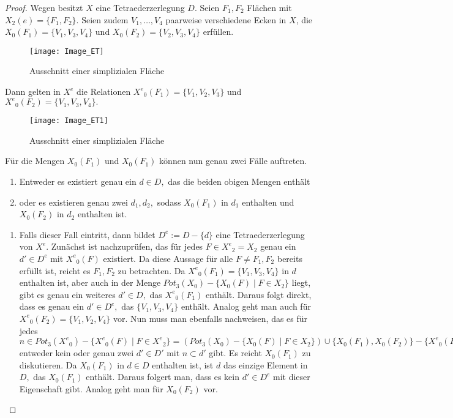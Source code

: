 \documentclass[12pt,titlepage,twoside,cleardoublepage]{article}
\theoremstyle{nummermitklammern}
\numberwithin{equation}{section}
\begin{document}
 \begin{proof}
 Wegen  besitzt $X$ eine Tetraederzerlegung $D.$ Seien $F_1,F_2$ Flächen mit $X_2(e)=\{F_1,F_2\}.$ Seien zudem $V_1,\ldots,V_4$ paarweise verschiedene Ecken in $X$, die $X_0(F_1)=\{V_1,V_3,V_4\}$ und $X_0(F_2)=\{V_2,V_3,V_4\}$ erfüllen.
 \begin{figure}[H]
\begin{center}
\texttt{[image: Image\_ET]}
\end{center}
\caption{Ausschnitt einer simplizialen Fläche}
\end{figure}
 
 Dann gelten in $X^e$ die Relationen ${X^e}_0(F_1)=\{V_1,V_2,V_3\}$ und ${X^e}_0(F_2)=\{V_1,V_3,V_4\}.$
 \begin{figure}[H]
\begin{center}
\texttt{[image: Image\_ET1]}
\end{center}
\caption{Ausschnitt einer simplizialen Fläche}
\end{figure}
Für die Mengen ${X}_0(F_1)$ und ${X}_0(F_1)$ können nun genau zwei Fälle auftreten.
\begin{enumerate}
\item Entweder es existiert genau ein $d\in D,$ das die beiden obigen Mengen enthält
\item oder es existieren genau zwei $d_1,d_2,$ sodass $X_0(F_1)$ in $d_1$ enthalten und $X_0(F_2)$ in $d_2$ enthalten ist.
\end{enumerate}
\begin{enumerate}
\item Falls dieser Fall eintritt, dann bildet $D^e:=D-\{d\}$ eine Tetraederzerlegung von $X^e.$ Zunächst ist nachzuprüfen, das für jedes $F\in {X^e}_2=X_2$ genau ein $d'\in D^e$ mit ${X^e}_0(F)$ existiert. Da diese Aussage für alle $F\neq F_1,F_2$ bereits erfüllt ist, reicht es $F_1,F_2$ zu betrachten. Da ${X^e}_0(F_1)=\{V_1,V_3,V_4\}$ in $d$ enthalten ist, aber auch in der Menge $Pot_3(X_0)-\{X_0(F)\mid F\in X_2\}$ liegt, gibt es genau ein weiteres $d'\in D,$ das ${X^e}_0(F_1)$ enthält. Daraus folgt direkt, dass es genau ein $d'\in D^e,$ das $\{V_1,V_3,V_4\}$ enthält. Analog geht man auch für ${X^e}_0(F_2)=\{V_1,V_2,V_4\}$ vor.
Nun muss man ebenfalls nachweisen, das es für jedes $n\in Pot_3({X^e}_0)-\{{X^e}_0(F)\mid F\in {X^e}_2\}=(Pot_3({X}_0)-\{{X}_0(F)\mid F\in {X}_2\})\cup \{X_0(F_1),X_0(F_2)\}-\{{X^e}_0(F_1),{X^e}_0(F_2)\}$ entweder kein oder genau zwei $d'\in D'$ mit $n\subset d'$ gibt. Es reicht $X_0(F_1)$ zu diskutieren. Da $X_0(F_1)$ in $d\in D$ enthalten ist, ist $d$ das einzige Element in $D,$ das $X_0(F_1)$ enthält. Daraus folgert man, dass es kein $d'\in D^e$ mit dieser Eigenschaft gibt. Analog geht man für $X_0(F_2) $ vor.

\end{enumerate}
\end{proof}
\end{document}
